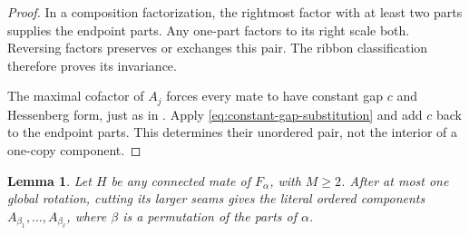 \documentclass[11pt,a4paper]{amsart}
\numberwithin{equation}{section}
\theoremstyle{plain}
\newtheorem{lemma}[theorem]{Lemma}
\theoremstyle{definition}
\begin{document}
\begin{proof}
In a composition factorization, the rightmost factor with at least two
parts supplies the endpoint parts.  Any one-part factors to its right
scale both.  Reversing factors preserves or exchanges this pair.
The ribbon classification therefore proves its invariance.

The maximal cofactor of \(A_j\) forces every mate to have constant
gap \(c\) and Hessenberg form, just as in
.  Apply
\eqref{eq:constant-gap-substitution} and add \(c\) back to the
endpoint parts.  This determines their unordered pair, not the interior
of a one-copy component.
\end{proof}

\begin{lemma}\label{lem:total-contraction-inverse}
Let \(H\) be any connected mate of \(F_\alpha\), with
\(M\ge2\).  After at most one global rotation, cutting its larger
seams gives the literal ordered components
\(A_{\beta_1},\ldots,A_{\beta_\ell}\), where \(\beta\) is a
permutation of the parts of \(\alpha\).
\end{lemma}
\end{document}
